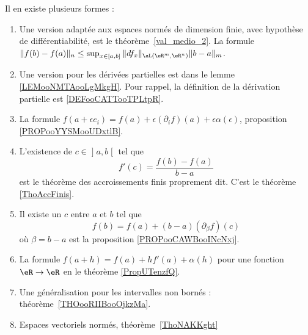 
        \label{INTERNooXFNTooNNaOzP}
Il en existe plusieurs formes :
\begin{enumerate}
	\item
	      Une version adaptée aux espaces normés de dimension finie, avec hypothèse de différentiabilité, est le théorème~\ref{val_medio_2}. La formule \( \|f(b)-f(a)\|_n\leq \sup_{x\in[a,b]}\|df_x\|_{\aL(\eR^m,\eR^n)}\|b-a\|_m\).
	\item
	      Une version pour les dérivées partielles est dans le lemme \ref{LEMooNMTAooLgMkgH}. Pour rappel, la définition de la dérivation partielle est \ref{DEFooCATTooTPLtpR}.
	\item
	      La formule \( f(a+\epsilon e_i)=f(a)+\epsilon(\partial_if)(a)+\epsilon\alpha(\epsilon)\), proposition \ref{PROPooYYSMooUDxtlB}.
	\item
	      L'existence de \( c\in \mathopen] a , b \mathclose[\) tel que
	      \begin{equation}
		      f'(c)=\frac{ f(b)-f(a) }{ b-a }
	      \end{equation}
	      est le théorème des accroissements finis proprement dit. C'est le théorème \ref{ThoAccFinis}.
	\item
	      Il existe un \( c\) entre \( a\) et \( b\) tel que
	      \begin{equation}
		      f(b)=f(a)+(b-a)(\partial_{\beta}f)(c)
	      \end{equation}
	      où \( \beta=b-a\) est la proposition \ref{PROPooCAWBooINcNxj}.
	\item
	      La formule \( f(a+h)=f(a)+hf'(a)+\alpha(h)\) pour une fonction \( \eR\to \eR\) en le théorème \ref{PropUTenzfQ}.
	\item
	      Une généralisation pour les intervalles non bornés : théorème~\ref{THOooRIIBooOjkzMa}.
	\item
	      Espaces vectoriels normés, théorème~\ref{ThoNAKKght}
\end{enumerate}

